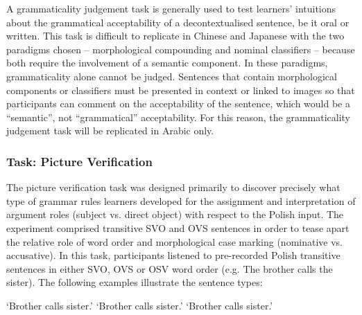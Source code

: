 \documentclass[output=paper,colorlinks,citecolor=brown,modfonts,nonflat]{../langscibook}
\begin{document}
A grammaticality judgement task is generally used to test learners’ intuitions about the grammatical acceptability of a decontextualised sentence, be it oral or written. This task is difficult to replicate in Chinese and Japanese with the two paradigms chosen – morphological compounding and nominal classifiers – because both require the involvement of a semantic component. In these paradigms, grammaticality alone cannot be judged. Sentences that contain morphological components or classifiers must be presented in context or linked to images so that participants can comment on the acceptability of the sentence, which would be a “semantic”, not “grammatical” acceptability. For this reason, the grammaticality judgement task will be replicated in Arabic only. 

\subsubsection{Task: Picture Verification}

The picture verification task was designed primarily to discover precisely what type of grammar rules learners developed for the assignment and interpretation of argument roles (subject vs. direct object) with respect to the Polish input. The experiment comprised transitive SVO and OVS sentences in order to tease apart the relative role of word order and morphological case marking (nominative vs. accusative). In this task, participants listened to pre-recorded Polish transitive sentences in either SVO, OVS or OSV word order (e.g. {\textasciigrave}The brother calls the sister{\textasciigrave}). The following examples illustrate the sentence types:

\ea%
    \label{ex:watorek:3}
        \glt    ‘Brother calls sister.’
        \glt    ‘Brother calls sister.’
        \glt    ‘Brother calls sister.’
    \z
\z
\end{document}
